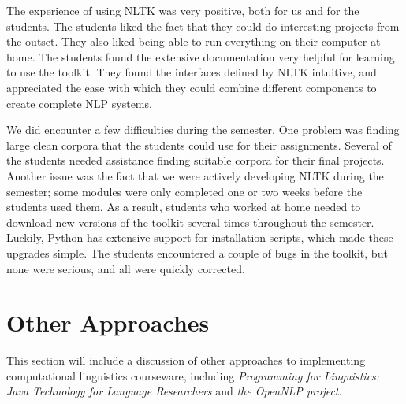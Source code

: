 \documentclass[11pt]{article}
\begin{document}


The experience of using NLTK was very positive, both for us and for
the students.  The students liked the fact that they could do
interesting projects from the outset.  They also liked being able to
run everything on their computer at home.  The students found the
extensive documentation very helpful for learning to use the toolkit.
They found the interfaces defined by NLTK intuitive, and appreciated
the ease with which they could combine different components to create
complete NLP systems.

We did encounter a few difficulties during the semester.  One problem
was finding large clean corpora that the students could use for their
assignments.  Several of the students needed assistance finding
suitable corpora for their final projects.  Another issue was the fact
that we were actively developing NLTK during the semester; some
modules were only completed one or two weeks before the students used
them.  As a result, students who worked at home needed to download new
versions of the toolkit several times throughout the semester.
Luckily, Python has extensive support for installation scripts, which
made these upgrades simple.  The students encountered a couple
of bugs in the toolkit, but none were serious, and all were quickly
corrected.

%

\section{Other Approaches}
\label{sec:approaches}

This section will include a discussion of other approaches to
implementing computational linguistics courseware, including
\emph{Programming for Linguistics: Java Technology for Language
Researchers}\cite{Hammond02} and \emph{the OpenNLP
project}\cite{opennlp}.
\end{document}
